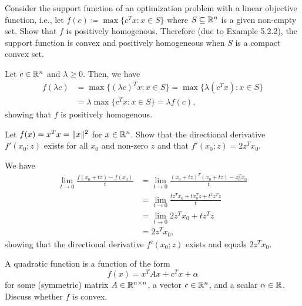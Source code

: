 \begin{exercise}
  Consider the support function of an optimization problem with a linear objective function, i.e., let $f(c) \coloneq \max\{ c^T x : x \in S \}$ where $S \subseteq \mathbb{R}^n$ is a given non-empty set.
  Show that $f$ is positively homogenous.
  Therefore (due to Example 5.2.2), the support function is convex and positively homogeneous when $S$ is a compact convex set.
\end{exercise}

\begin{solution}
  Let $c \in \mathbb{R}^n$ and $\lambda \geq 0$.
  Then, we have
  \begin{align*}
    f(\lambda c)
    &= \max\{ (\lambda c)^T x : x \in S \}
    = \max\{ \lambda (c^T x) : x \in S \} \\
    &= \lambda \max\{ c^T x : x \in S \}
    = \lambda f(c),
  \end{align*}
  showing that $f$ is positively homogenous.
\end{solution}

\begin{exercise}
  Let $f(x) = x^T x = \lVert x\rVert^2$ for $x \in \mathbb{R}^n$.
  Show that the directional derivative $f'(x_0; z)$ exists for all $x_0$ and non-zero $z$ and that $f'(x_0; z) = 2 z^T x_0$.
\end{exercise}

\begin{solution}
  We have
  \begin{align*}
    \lim_{t \to 0} \frac{f(x_0 + t z) - f(x_0)}{t}
    &= \lim_{t \to 0} \frac{(x_0 + t z)^T (x_0 + t z) - x_0^T x_0}{t} \\
    &= \lim_{t \to 0} \frac{t z^T x_0 + t x_0^T z + t^2 z^T z}{t} \\
    &= \lim_{t \to 0} 2 z^T x_0 + t z^T z \\
    &= 2 z^T x_0,
  \end{align*}
  showing that the directional derivative $f'(x_0; z)$ exists and equals $2 z^T x_0$.
\end{solution}

\begin{exercise}
  A quadratic function is a function of the form
  \begin{equation}
    f(x) = x^T A x + c^T x + \alpha
  \end{equation}
  for some (symmetric) matrix $A \in \mathbb{R}^{n \times n}$, a vector $c \in \mathbb{R}^n$, and a scalar $\alpha \in \mathbb{R}$.
  Discuss whether $f$ is convex.
\end{exercise}

